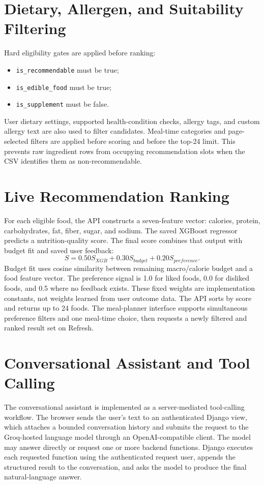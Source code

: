 \documentclass[12pt,a4paper]{report}
\begin{document}
\section{Dietary, Allergen, and Suitability Filtering}
Hard eligibility gates are applied before ranking:
\begin{itemize}
      \item \texttt{is\_recommendable} must be true;
      \item \texttt{is\_edible\_food} must be true;
      \item \texttt{is\_supplement} must be false.
\end{itemize}
User dietary settings, supported health-condition checks, allergy tags, and custom
allergy text are also used to filter candidates. Meal-time categories and page-selected
filters are applied before scoring and before the top-24 limit. This prevents raw
ingredient rows from occupying recommendation slots when the CSV identifies them as
non-recommendable.

\section{Live Recommendation Ranking}
For each eligible food, the API constructs a seven-feature vector:
calories, protein, carbohydrates, fat, fiber, sugar, and sodium. The saved XGBoost
regressor predicts a nutrition-quality score. The final score combines that output with
budget fit and saved user feedback:
\begin{equation}
S = 0.50S_{XGB} + 0.30S_{budget} + 0.20S_{preference}.
\end{equation}
Budget fit uses cosine similarity between remaining macro/calorie budget and a food
feature vector. The preference signal is 1.0 for liked foods, 0.0 for disliked foods, and
0.5 where no feedback exists. These fixed weights are implementation constants, not
weights learned from user outcome data. The API sorts by score and returns up to 24
foods. The meal-planner interface supports simultaneous preference filters and one
meal-time choice, then requests a newly filtered and ranked result set on Refresh.

\section{Conversational Assistant and Tool Calling}
The conversational assistant is implemented as a server-mediated tool-calling workflow.
The browser sends the user's text to an authenticated Django view, which attaches a
bounded conversation history and submits the request to the Groq-hosted language model
through an OpenAI-compatible client. The model may answer directly or request one or
more backend functions. Django executes each requested function using the authenticated
request user, appends the structured result to the conversation, and asks the model to
produce the final natural-language answer.
\end{document}
